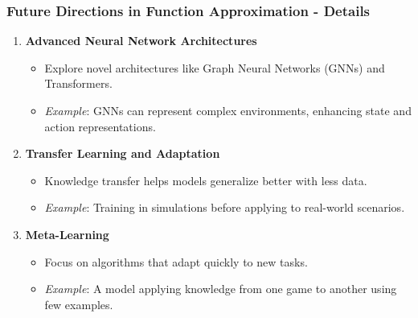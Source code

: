 \documentclass[aspectratio=169]{beamer}
\begin{document}
\begin{frame}[fragile]
  \frametitle{Future Directions in Function Approximation - Details}
  \begin{enumerate}
    \item \textbf{Advanced Neural Network Architectures}
      \begin{itemize}
        \item Explore novel architectures like Graph Neural Networks (GNNs) and Transformers.
        \item \textit{Example}: GNNs can represent complex environments, enhancing state and action representations.
      \end{itemize}
    
    \item \textbf{Transfer Learning and Adaptation}
      \begin{itemize}
        \item Knowledge transfer helps models generalize better with less data.
        \item \textit{Example}: Training in simulations before applying to real-world scenarios.
      \end{itemize}

    \item \textbf{Meta-Learning}
      \begin{itemize}
        \item Focus on algorithms that adapt quickly to new tasks.
        \item \textit{Example}: A model applying knowledge from one game to another using few examples.
      \end{itemize}
  \end{enumerate}
\end{frame}
\end{document}
